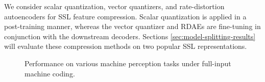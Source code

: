 \documentclass[10pt,twocolumn,letterpaper]{article}
\begin{document}
We consider scalar quantization, vector quantizers, and rate-distortion autoencoders for SSL feature compression. Scalar quantization is applied in a post-training manner, whereas the vector quantizer and RDAEs are fine-tuning in conjunction with the downstream decoders. Sections \ref{sec:model-splitting-results} will evaluate these compression methods on two popular SSL representations.



\begin{figure}
\begin{center}
\end{center}
\caption{\label{fig:mpq_results}%
Performance on various machine perception tasks under full-input machine coding.}
\end{figure}
\end{document}
